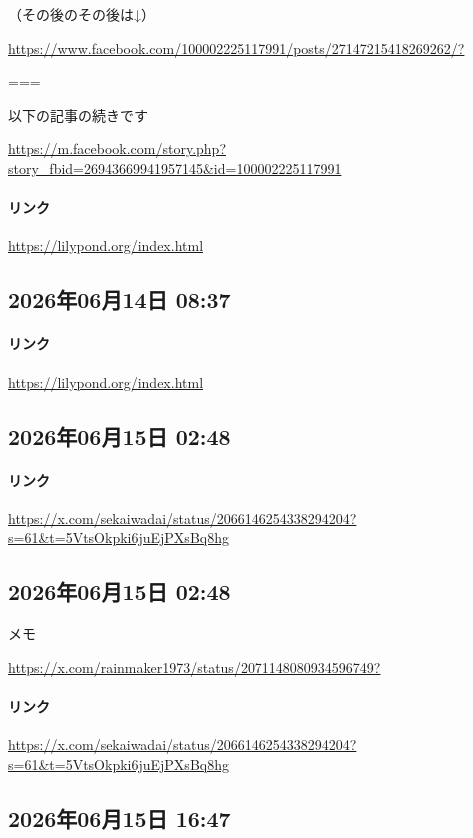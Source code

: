 （その後のその後は↓）

\url{https://www.facebook.com/100002225117991/posts/27147215418269262/?}

===

以下の記事の続きです

\url{https://m.facebook.com/story.php?story_fbid=26943669941957145&id=100002225117991}

\paragraph{リンク}
\url{https://lilypond.org/index.html}

\subsection*{2026年06月14日 08:37}

\paragraph{リンク}
\url{https://lilypond.org/index.html}

\subsection*{2026年06月15日 02:48}

\paragraph{リンク}
\url{https://x.com/sekaiwadai/status/2066146254338294204?s=61&t=5VtsOkpki6juEjPXsBq8hg}

\subsection*{2026年06月15日 02:48}

メモ

\url{https://x.com/rainmaker1973/status/2071148080934596749?}

\paragraph{リンク}
\url{https://x.com/sekaiwadai/status/2066146254338294204?s=61&t=5VtsOkpki6juEjPXsBq8hg}

\subsection*{2026年06月15日 16:47}

